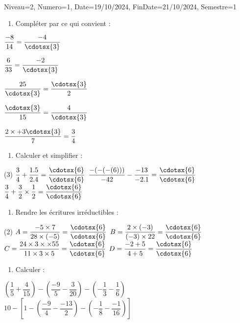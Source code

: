 \documentclass[a4paper,12pt]{article}
\begin{document}
\begin{Maquette}[DM]{Niveau=2, Numero=1, Date=19/10/2024, FinDate=21/10/2024, Semestre=1}

\begin{exercice}
\begin{enumerate}
\item Compléter par ce qui convient :
\end{enumerate}
\begin{itemize*}
\item $\dfrac{-8}{14}=\dfrac{-4}{\cdotsx{3}}$
\item $\dfrac{6}{33}=\dfrac{-2}{\cdotsx{3}}$
\item $\dfrac{25}{\cdotsx{3}}=\dfrac{\cdotsx{3}}{2}$
\item $\dfrac{\cdotsx{3}}{15}=\dfrac{4}{\cdotsx{3}}$
\item $\dfrac{2\times+3 \cdotsx{3}}{7}=\dfrac{3}{4}$
\end{itemize*}
\end{exercice}

\begin{exercice}
\begin{enumerate}
\item Calculer et simplifier :
\end{enumerate}
\begin{tasks}[style=itemize](3)
\task $\dfrac{3}{4}+\dfrac{1.5}{2.4}=\dfrac{\cdotsx{6}}{\cdotsx{6}}$
\task* $\dfrac{-(-(-(6)))}{-42}-\dfrac{-13}{-2.1}=\dfrac{\cdotsx{6}}{\cdotsx{6}}$
\task  $\dfrac{3}{4}+\dfrac{3}{2}\times \dfrac{1}{2}=\dfrac{\cdotsx{6}}{\cdotsx{6}}$
\end{tasks}
\end{exercice}

\begin{exercice}
\begin{enumerate}
\item Rendre les écritures irréductibles :
\end{enumerate}
\begin{tasks}[style=itemize](2)
\task $A=\dfrac{-5\times7}{28\times(-5)} =\dfrac{\cdotsx{6}}{\cdotsx{6}}$
\task $B=\dfrac{2\times(-3)}{(-3)\times22}=\dfrac{\cdotsx{6}}{\cdotsx{6}}$
\task $C=\dfrac{24\times3\times\times55}{11\times3\times5}=\dfrac{\cdotsx{6}}{\cdotsx{6}}$
\task $D=\dfrac{-2+5}{4+5}=\dfrac{\cdotsx{6}}{\cdotsx{6}}$
\end{tasks}
\end{exercice}

\begin{exercice}
\begin{enumerate}
\item Calculer :
\end{enumerate}
\begin{tasks}
\task $\left( \dfrac{1}{5}+\dfrac{4}{15}\right) -\left( \dfrac{-9}{5}-\dfrac{3}{20}\right) -\left( -\dfrac{1}{3}-\dfrac{1}{6} \right)$
\task $ 10 -\left[ 1-\left( \dfrac{-9}{4}-\dfrac{-13}{2}\right) -\left( -\dfrac{1}{8}-\dfrac{-1}{16} \right)\right]$
\end{tasks}
\end{exercice}


\end{Maquette}
\end{document}
